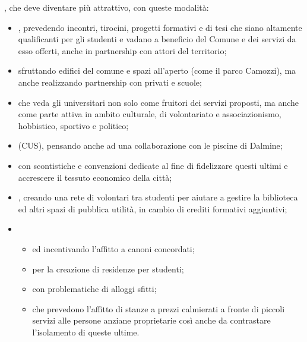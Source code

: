 , che deve diventare più attrattivo, con queste modalità:
\begin{itemize}
  \item {}, prevedendo incontri, tirocini, progetti formativi e di tesi che siano altamente qualificanti per gli studenti e vadano a beneficio del Comune e dei servizi da esso offerti, anche in partnership con attori del territorio;
  \item {} sfruttando edifici del comune e spazi all'aperto (come il parco Camozzi), ma anche realizzando partnership con privati e scuole;
  \item {} che veda gli universitari non solo come fruitori dei servizi proposti, ma anche come parte attiva in ambito culturale, di volontariato e associazionismo, hobbistico, sportivo e politico;
  \item {} (CUS), pensando anche ad una collaborazione con le piscine di Dalmine;
  \item {} con scontistiche e convenzioni dedicate al fine di fidelizzare questi ultimi e accrescere il tessuto economico della città;
  \item {}, creando una rete di volontari tra studenti per aiutare a gestire la biblioteca ed altri spazi di pubblica utilità, in cambio di crediti formativi aggiuntivi;
  \item {} \begin{itemize}
    \item {} ed incentivando l'affitto a canoni concordati;
    \item {} per la creazione di residenze per studenti;
    \item {} con problematiche di alloggi sfitti;
    \item {} che prevedono l'affitto di stanze a prezzi calmierati a fronte di piccoli servizi alle persone anziane proprietarie così anche da contrastare l'isolamento di queste ultime.
  \end{itemize}
\end{itemize}
